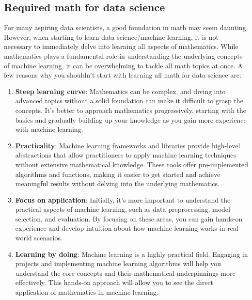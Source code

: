 \documentclass[10pt]{extarticle}
\newcommand{\<}{\langle}
\renewcommand{\>}{\rangle}
\theoremstyle{mystyle}{\newtheorem*{remark}{Remark}}
\theoremstyle{mystyle}{\newtheorem*{remarks}{Remarks}}
\theoremstyle{mystyle}{\newtheorem*{example}{Example}}
\theoremstyle{mystyle}{\newtheorem*{examples}{Examples}}
\theoremstyle{definition}{\newtheorem*{exercise}{Exercise}}
\theoremstyle{warn}
\begin{document}
\subsection{Required math for data science}
For many aspiring data scientists, a good foundation in math may seem daunting. However, when starting to learn data science/machine learning, it is not necessary to immediately delve into learning all aspects of mathematics. While mathematics plays a fundamental role in understanding the underlying concepts of machine learning, it can be overwhelming to tackle all math topics at once. A few reasons why you shouldn't start with learning all math for data science are:

\begin{enumerate}
\item \textbf{Steep learning curve}: Mathematics can be complex, and diving into advanced topics without a solid foundation can make it difficult to grasp the concepts. It's better to approach mathematics progressively, starting with the basics and gradually building up your knowledge as you gain more experience with machine learning.

\item \textbf{Practicality}: Machine learning frameworks and libraries provide high-level abstractions that allow practitioners to apply machine learning techniques without extensive mathematical knowledge. These tools offer pre-implemented algorithms and functions, making it easier to get started and achieve meaningful results without delving into the underlying mathematics.

\item \textbf{Focus on application}: Initially, it's more important to understand the practical aspects of machine learning, such as data preprocessing, model selection, and evaluation. By focusing on these areas, you can gain hands-on experience and develop intuition about how machine learning works in real-world scenarios.

\item \textbf{Learning by doing}: Machine learning is a highly practical field. Engaging in projects and implementing machine learning algorithms will help you understand the core concepts and their mathematical underpinnings more effectively. This hands-on approach will allow you to see the direct application of mathematics in machine learning.
\end{enumerate}
\end{document}
